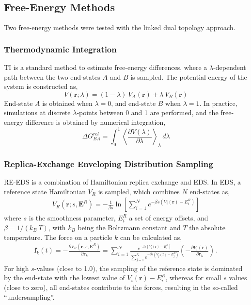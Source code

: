 \FloatBarrier

\subsection{Free-Energy Methods}
Two free-energy methods were tested with the linked dual topology approach.

\subsubsection{Thermodynamic Integration}
TI is a standard method to estimate free-energy differences,\cite{Kirkwood1935} where a $\lambda$-dependent path between the two end-states $A$ and $B$ is sampled. The potential energy of the system is constructed as,
\begin{equation}
    V(\textbf{r}; \lambda) = (1-\lambda) ~ V_A(\textbf{r}) + \lambda ~ V_B(\textbf{r})
    \label{eq: TI-Potential}
\end{equation}
End-state $A$ is obtained when $\lambda = 0$, and end-state $B$ when $\lambda = 1$. In practice, simulations at discrete $\lambda$-points between 0 and 1 are performed, and the free-energy difference is obtained by numerical integration,
\begin{equation}
    \Delta G^{rel}_{BA} = \int^{1}_{0} \left< \frac{\partial V(\lambda)}{\partial \lambda} \right>_{\lambda} \,d\lambda
    \label{eq: TI-Integration}
\end{equation}

\subsubsection{Replica-Exchange Enveloping Distribution Sampling}
RE-EDS\cite{Sidler2016,Sidler2017,Ries2022} is a combination of Hamiltonian replica exchange\cite{Hansmann1997,Sugita2000} and EDS.\cite{Christ2007,Christ2008} In EDS, a reference state Hamiltonian $V_R$ is sampled, which combines $N$ end-states as,
\begin{align}
    V_R\left(\textbf{r};s,\textbf{E}^R\right) = -\frac{1}{\beta s}\ln\left[\sum\limits_{i=1}^N e^{-\beta s\left(V_i(\textbf{r})-E_i^R\right)}\right]
\end{align}
where $s$ is the smoothness parameter, $E_i^R$ a set of energy offsets, and $\beta=1/(k_B~T)$, with $k_B$ being the Boltzmann constant and $T$ the absolute temperature. 
The force on a particle $k$ can be calculated as, \cite{Christ2007,Christ2008}
\begin{align}
    \textbf{f}_k(t)=-\frac{\partial V_R(\textbf{r}; s, \textbf{E}^R)}{\partial \textbf{r}_k} = \sum^N_{i=1}\frac{e^{-\beta s(V_i(\textbf{r}) -E_i^R)}}{\sum^N_{j=1}{e^{-\beta s (V_j(\textbf{r})-E_j^R)}}}  \left( -\frac{\partial V_i(\textbf{r})}{\partial \textbf{r}_k} \right) \,.
\end{align}
For high $s$-values (close to 1.0), the sampling of the reference state is dominated by the end-state with the lowest value of $V_i(\textbf{r}) - E_i^R$, whereas for small $s$ values (close to zero), all end-states contribute to the forces, resulting in the so-called ``undersampling''.\cite{Riniker2011} 

